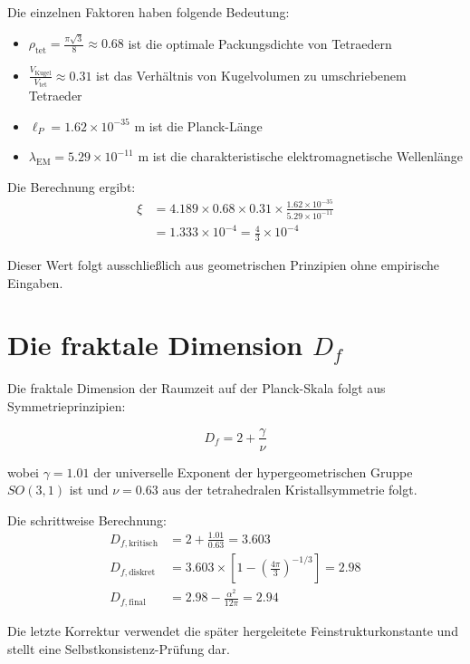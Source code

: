 \documentclass[12pt,a4paper]{article}
\theoremstyle{definition}
\begin{document}
	Die einzelnen Faktoren haben folgende Bedeutung:
	\begin{itemize}
		\item $\rho_{\text{tet}} = \frac{\pi\sqrt{3}}{8} \approx 0.68$ ist die optimale Packungsdichte von Tetraedern
		\item $\frac{V_{\text{Kugel}}}{V_{\text{tet}}} \approx 0.31$ ist das Verh\"altnis von Kugelvolumen zu umschriebenem Tetraeder
		\item $\ell_P = 1.62 \times 10^{-35}$ m ist die Planck-L\"ange
		\item $\lambda_{\text{EM}} = 5.29 \times 10^{-11}$ m ist die charakteristische elektromagnetische Wellenl\"ange
	\end{itemize}
	
	Die Berechnung ergibt:
	\begin{align}
		\xi &= 4.189 \times 0.68 \times 0.31 \times \frac{1.62 \times 10^{-35}}{5.29 \times 10^{-11}}\\
		&= 1.333 \times 10^{-4} = \frac{4}{3} \times 10^{-4}
	\end{align}
	
	Dieser Wert folgt ausschlie\ss lich aus geometrischen Prinzipien ohne empirische Eingaben.
	
	\section{Die fraktale Dimension $D_f$}
	
	Die fraktale Dimension der Raumzeit auf der Planck-Skala folgt aus Symmetrieprinzipien:
	
	\begin{equation}
		D_f = 2 + \frac{\gamma}{\nu}
	\end{equation}
	
	wobei $\gamma = 1.01$ der universelle Exponent der hypergeometrischen Gruppe $SO(3,1)$ ist und $\nu = 0.63$ aus der tetrahedralen Kristallsymmetrie folgt.
	
	Die schrittweise Berechnung:
	\begin{align}
		D_{f,\text{kritisch}} &= 2 + \frac{1.01}{0.63} = 3.603\\
		D_{f,\text{diskret}} &= 3.603 \times \left[1 - \left(\frac{4\pi}{3}\right)^{-1/3}\right] = 2.98\\
		D_{f,\text{final}} &= 2.98 - \frac{\alpha^2}{12\pi} = 2.94
	\end{align}
	
	Die letzte Korrektur verwendet die sp\"ater hergeleitete Feinstrukturkonstante und stellt eine Selbstkonsistenz-Pr\"ufung dar.
	
\end{document}
